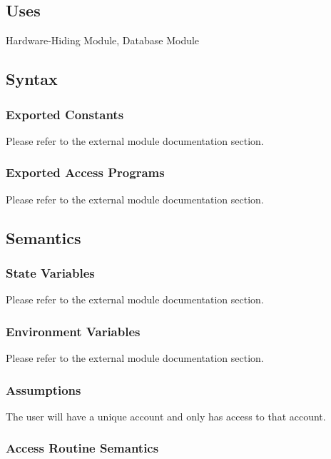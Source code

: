 \documentclass[12pt, titlepage]{article}
\begin{document}
\subsection{Uses}

Hardware-Hiding Module, Database Module

\subsection{Syntax}

\subsubsection{Exported Constants}

Please refer to the external module documentation section.

\subsubsection{Exported Access Programs}

Please refer to the external module documentation section.

\subsection{Semantics}

\subsubsection{State Variables}

Please refer to the external module documentation section.

\subsubsection{Environment Variables}

Please refer to the external module documentation section.

\subsubsection{Assumptions}

The user will have a unique account and only has access to that account.

\subsubsection{Access Routine Semantics}
\end{document}
